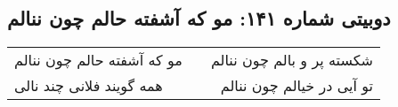 \begin{center}
\section*{دوبیتی شماره ۱۴۱: مو که آشفته حالم چون ننالم}
\label{sec:141}
\begin{longtable}{l p{0.5cm} r}
مو که آشفته حالم چون ننالم
&&
شکسته پر و بالم چون ننالم
\\
همه گویند فلانی چند نالی
&&
تو آیی در خیالم چون ننالم
\\
\end{longtable}
\end{center}
